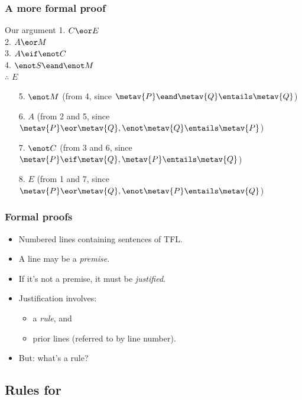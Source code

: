 \begin{frame}
  \frametitle{A more formal proof}

  \begin{block}{Our argument}
    1. \alert<4>{$C \eor E$}\\
    2. \alert<2>{$A \eor M$}\\
    3. \alert<3>{$A \eif \enot C$}\\
    4. \alert<1>{$\enot S \eand \enot M$} \\
  $\therefore$ $E$
  \end{block}

  \begin{enumerate}[<+->]
    \item[5.] \alert<1,2>{$\enot M$} (from 4, since $\metav{P} \eand \metav{Q}
    \entails \metav{Q}$)
    \item[6.] \alert<2,3>{$A$} (from 2 and 5, since $\metav{P} \eor \metav{Q}, \enot \metav{Q} \entails \metav{P}$)
    \item[7.] \alert<3,4>{$\enot C$} (from 3 and 6, since $\metav{P} \eif \metav{Q}, \metav{P}
    \entails \metav{Q}$)
    \item[8.] \alert<4>{$E$} (from 1 and 7, since $\metav{P} \eor \metav{Q}, \enot \metav{P}
    \entails \metav{Q}$)
  \end{enumerate}

\end{frame}

\begin{frame}
  \frametitle{Formal proofs}

  \begin{itemize}[<+->]
    \item Numbered lines containing sentences of TFL.
    \item A line may be a \emph{premise}.
    \item If it's not a premise, it must be \emph{justified}.
    \item Justification involves:
      \begin{itemize}
        \item a \emph{rule}, and
        \item prior lines (referred to by line number).
      \end{itemize}
    \item But: what's a rule?
  \end{itemize}
\end{frame}

\subsection{Rules for \eand}

